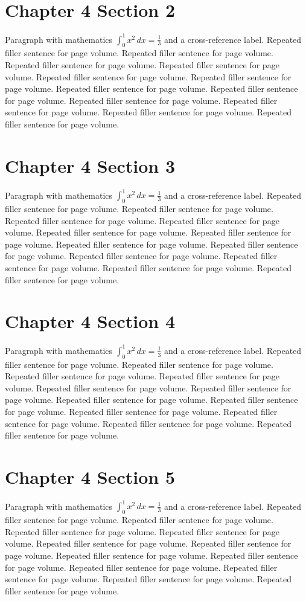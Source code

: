 \documentclass[11pt]{report}
\begin{document}
\section{Chapter 4 Section 2}
Paragraph with mathematics $\int_0^1 x^2\,dx = \frac13$ and a cross-reference label.
\label{sec:4:2}
Repeated filler sentence for page volume. Repeated filler sentence for page volume. Repeated filler sentence for page volume. Repeated filler sentence for page volume. Repeated filler sentence for page volume. Repeated filler sentence for page volume. Repeated filler sentence for page volume. Repeated filler sentence for page volume. Repeated filler sentence for page volume. Repeated filler sentence for page volume. Repeated filler sentence for page volume. Repeated filler sentence for page volume. 
\section{Chapter 4 Section 3}
Paragraph with mathematics $\int_0^1 x^2\,dx = \frac13$ and a cross-reference label.
\label{sec:4:3}
Repeated filler sentence for page volume. Repeated filler sentence for page volume. Repeated filler sentence for page volume. Repeated filler sentence for page volume. Repeated filler sentence for page volume. Repeated filler sentence for page volume. Repeated filler sentence for page volume. Repeated filler sentence for page volume. Repeated filler sentence for page volume. Repeated filler sentence for page volume. Repeated filler sentence for page volume. Repeated filler sentence for page volume. 
\section{Chapter 4 Section 4}
Paragraph with mathematics $\int_0^1 x^2\,dx = \frac13$ and a cross-reference label.
\label{sec:4:4}
Repeated filler sentence for page volume. Repeated filler sentence for page volume. Repeated filler sentence for page volume. Repeated filler sentence for page volume. Repeated filler sentence for page volume. Repeated filler sentence for page volume. Repeated filler sentence for page volume. Repeated filler sentence for page volume. Repeated filler sentence for page volume. Repeated filler sentence for page volume. Repeated filler sentence for page volume. Repeated filler sentence for page volume. 
\section{Chapter 4 Section 5}
Paragraph with mathematics $\int_0^1 x^2\,dx = \frac13$ and a cross-reference label.
\label{sec:4:5}
Repeated filler sentence for page volume. Repeated filler sentence for page volume. Repeated filler sentence for page volume. Repeated filler sentence for page volume. Repeated filler sentence for page volume. Repeated filler sentence for page volume. Repeated filler sentence for page volume. Repeated filler sentence for page volume. Repeated filler sentence for page volume. Repeated filler sentence for page volume. Repeated filler sentence for page volume. Repeated filler sentence for page volume. 
\end{document}
